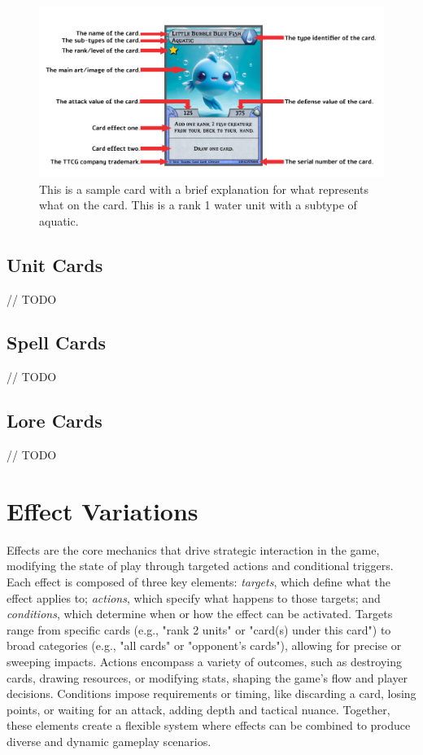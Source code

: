 \begin{figure}[h]
    \centering
    \includegraphics[width=\textwidth]{images/card_details.png} 
    \caption{This is a sample card with a brief explanation for what represents what on the card. This is a rank 1 water unit with a subtype of aquatic.}
    \label{fig:sample_card}
\end{figure}



\subsection{Unit Cards}
// TODO



\subsection{Spell Cards}
// TODO



\subsection{Lore Cards}
// TODO







\section{Effect Variations}
Effects are the core mechanics that drive strategic interaction in the game, modifying the state of play through targeted actions and conditional triggers. Each effect is composed of three key elements: \textit{targets}, which define what the effect applies to; \textit{actions}, which specify what happens to those targets; and \textit{conditions}, which determine when or how the effect can be activated. Targets range from specific cards (e.g., "rank 2 units" or "card(s) under this card") to broad categories (e.g., "all cards" or "opponent’s cards"), allowing for precise or sweeping impacts. Actions encompass a variety of outcomes, such as destroying cards, drawing resources, or modifying stats, shaping the game’s flow and player decisions. Conditions impose requirements or timing, like discarding a card, losing points, or waiting for an attack, adding depth and tactical nuance. Together, these elements create a flexible system where effects can be combined to produce diverse and dynamic gameplay scenarios.


